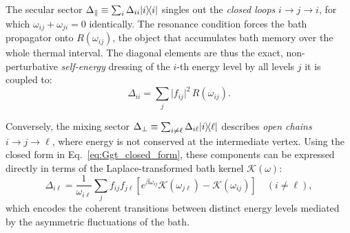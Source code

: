 The secular sector $\Delta_{\parallel} \equiv \sum_i \Delta_{ii}|i\rangle\!\langle i|$ singles out the \emph{closed loops}
$i\to j\to i$, for which $\omega_{ij}+\omega_{ji}=0$ identically. The resonance condition forces
the bath propagator onto $R(\omega_{ij})$, the object that accumulates bath memory over the whole
thermal interval. The diagonal elements are thus the exact, non-perturbative \emph{self-energy} dressing of the $i$-th energy level by all levels $j$ it is coupled to:
\begin{equation}
    \Delta_{ii} = \sum_j\lvert f_{ij}\rvert^2\,R(\omega_{ij}).
    \label{eq:Delta_selfenergy}
\end{equation}

Conversely, the mixing sector $\Delta_{\perp} \equiv \sum_{i\neq\ell} \Delta_{i\ell}|i\rangle\!\langle\ell|$ describes \emph{open chains} $i\to j\to\ell$, where energy is not conserved at the intermediate vertex. Using the closed form in Eq.~\eqref{eq:Ggt_closed_form}, these components can be expressed directly in terms of the Laplace-transformed bath kernel $\mathcal{K}(\omega)$:
\begin{equation}
    \Delta_{i\ell} = \frac{1}{\omega_{i\ell}} \sum_j f_{ij}f_{j\ell} \left[ e^{\beta\omega_{ij}}\mathcal{K}(\omega_{j\ell}) - \mathcal{K}(\omega_{ij}) \right] \quad (i \neq \ell),
    \label{eq:Delta_mixing_Laplace}
\end{equation}
which encodes the coherent transitions between distinct energy levels mediated by the asymmetric fluctuations of the bath. 

